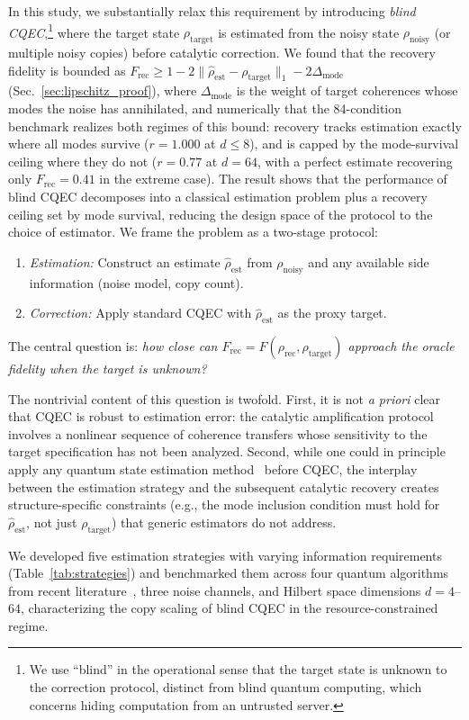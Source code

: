 \documentclass[pra,twocolumn,superscriptaddress,longbibliography,floatfix,nofootinbib]{revtex4-2}
\newcommand{\Frec}{F_\mathrm{rec}}
\newcommand{\rhot}{\rho_\mathrm{target}}
\newcommand{\rhon}{\rho_\mathrm{noisy}}
\newcommand{\rhor}{\rho_\mathrm{rec}}
\newcommand{\rhoe}{\hat{\rho}_\mathrm{est}}
\begin{document}
In this study, we substantially relax this requirement by introducing \emph{blind CQEC},\footnote{We use ``blind'' in the operational sense that the target state is unknown to the correction protocol, distinct from blind quantum computing, which concerns hiding computation from an untrusted server.} where the target state $\rhot$ is estimated from the noisy state $\rhon$ (or multiple noisy copies) before catalytic correction.
We found that the recovery fidelity is bounded as $\Frec \geq 1 - 2\|\rhoe - \rhot\|_1 - 2\Delta_\mathrm{mode}$ (Sec.~\ref{sec:lipschitz_proof}), where $\Delta_\mathrm{mode}$ is the weight of target coherences whose modes the noise has annihilated, and numerically that the 84-condition benchmark realizes both regimes of this bound: recovery tracks estimation exactly where all modes survive ($r = 1.000$ at $d \leq 8$), and is capped by the mode-survival ceiling where they do not ($r = 0.77$ at $d = 64$, with a perfect estimate recovering only $\Frec = 0.41$ in the extreme case).
The result shows that the performance of blind CQEC decomposes into a classical estimation problem plus a recovery ceiling set by mode survival, reducing the design space of the protocol to the choice of estimator.
We frame the problem as a two-stage protocol:
\begin{enumerate}
\item \emph{Estimation:} Construct an estimate $\rhoe$ from $\rhon$ and any available side information (noise model, copy count).
\item \emph{Correction:} Apply standard CQEC with $\rhoe$ as the proxy target.
\end{enumerate}
The central question is: \emph{how close can $\Frec = F(\rhor, \rhot)$ approach the oracle fidelity when the target is unknown?}

The nontrivial content of this question is twofold.
First, it is not \emph{a priori} clear that CQEC is robust to estimation error: the catalytic amplification protocol involves a nonlinear sequence of coherence transfers whose sensitivity to the target specification has not been analyzed.
Second, while one could in principle apply any quantum state estimation method~\cite{Hradil1997,Gross2010,Haah2017} before CQEC, the interplay between the estimation strategy and the subsequent catalytic recovery creates structure-specific constraints (e.g., the mode inclusion condition must hold for $\rhoe$, not just $\rhot$) that generic estimators do not address.

We developed five estimation strategies with varying information requirements (Table~\ref{tab:strategies}) and benchmarked them across four quantum algorithms from recent literature~\cite{Chen2021,Ivashkov2024,Clinton2026,Regev2024}, three noise channels, and Hilbert space dimensions $d = 4$--$64$, characterizing the copy scaling of blind CQEC in the resource-constrained regime.
\end{document}
